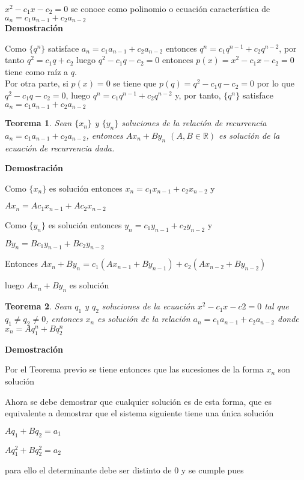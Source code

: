 \documentclass[a4paper,12pt]{report}
\newtheorem*{teo}{Teorema}
\begin{document}
  $x^2-c_1x-c_2=0$ se conoce como polinomio o ecuación característica de $a_n=c_1a_{n-1}+c_2a_{n-2}$ \\

  
   \textbf{Demostración}

   Como $\{q^n\}$ satisface $a_n=c_1a_{n-1}+c_2a_{n-2}$ entonces $q^n=c_1q^{n-1}+c_2q^{n-2}$, por tanto
   $q^2=c_1q+c_2$ luego  $q^2-c_1q-c_2=0$ entonces $p(x)=x^2-c_1x-c_2=0$ tiene como raíz a $q$.\\
   
   Por otra parte, si $p(x)=0$ se tiene que $p(q)=q^2-c_1q-c_2=0$ por lo que $q^2-c_1q-c_2=0$, luego $q^n=c_1q^{n-1}+c_2q^{n-2}$ y, por tanto, $\{q^n\}$ satisface $a_n=c_1a_{n-1}+c_2a_{n-2}$
   
\begin{teo}
 Sean $\{x_n\}$ y $\{y_n\}$ soluciones de la relación de recurrencia\\ 
 $a_n=c_1a_{n-1}+c_2a_{n-2}$, entonces $Ax_n + By_n$  $(A,B\in\mathbb{R})$ es solución de la ecuación de recurrencia dada.
\end{teo}

\textbf{Demostración}

Como $\{x_n\}$ es solución entonces $x_n=c_1x_{n-1}+c_2x_{n-2}$ y

$Ax_n=Ac_1x_{n-1}+Ac_2x_{n-2}$

Como $\{y_n\}$ es solución entonces $y_n=c_1y_{n-1}+c_2y_{n-2}$ y

$By_n=Bc_1y_{n-1}+Bc_2y_{n-2}$

Entonces $Ax_n+By_n=c_1(Ax_{n-1}+By_{n-1})+c_2(Ax_{n-2}+By_{n-2})$

luego $Ax_n+By_n$ es solución

\begin{teo}
 Sean $q_1$ y $q_2$ soluciones de la ecuación $x^2-c_1x-c2=0$ tal que $q_1\neq q_2 \neq 0$, entonces $x_n$ es solución de la relación $a_n=c_1a_{n-1}+c_2a_{n-2}$ donde $x_n=Aq^n_1+Bq^n_2$
\end{teo}

\textbf{Demostración}

Por el Teorema previo se tiene entonces que las sucesiones de la forma $x_n$ son solución

Ahora se debe demostrar que cualquier solución es de esta forma, que es equivalente a demostrar que el sistema siguiente tiene una única solución

$Aq_1+Bq_2=a_1$

$Aq^2_1+Bq^2_2=a_2$

para ello el determinante debe ser distinto de 0 y se cumple pues
\end{document}
